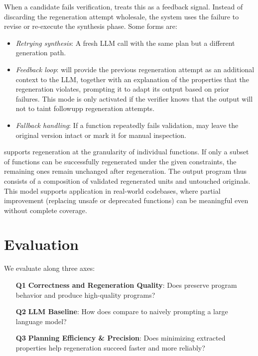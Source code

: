 \documentclass[a4paper,twoside,12pt]{report} %
\begin{document}
When a candidate fails verification, \sys treats this as a feedback signal. Instead of discarding the regeneration attempt wholesale, the system uses the failure to revise or re-execute the synthesis phase.
Some forms are:
\begin{itemize}
  \item \emph{Retrying synthesis}: A fresh LLM call with the same plan but a different generation path.
  \item \emph{Feedback loop}: \sys will provide the previous regeneration attempt 
    as an additional context to the LLM, together with an explanation of the properties that the regeneration violates, prompting it to adapt its output based on prior failures.
    This mode is only activated if the verifier knows that the output will not to taint
    followupp regeneration attempts.
  \item \emph{Fallback handling}: If a function repeatedly fails validation, \sys may leave the original version intact or mark it for manual inspection.
\end{itemize}


\sys supports regeneration at the granularity of individual functions.
If only a subset of functions can be successfully regenerated under the given constraints, the remaining ones remain unchanged after regeneration.
The output program thus consists of a composition of validated regenerated units and untouched originals.
This model supports application in real-world codebases, where partial improvement (\eg replacing unsafe or deprecated functions) can be meaningful even without complete coverage.

\chapter{Evaluation}
\label{sec:evaluation}

We evaluate \sys along three axes:

\begin{itemize}
  \item[\textbf{Q1}] \textbf{Correctness and Regeneration Quality}: Does \sys preserve program behavior and produce high-quality programs?
  \item[\textbf{Q2}] \textbf{LLM Baseline}: How does \sys compare to naively prompting a large language model?
  \item[\textbf{Q3}] \textbf{Planning Efficiency \& Precision}: Does minimizing extracted properties help regeneration succeed faster and more reliably?
\end{itemize}
\end{document}
